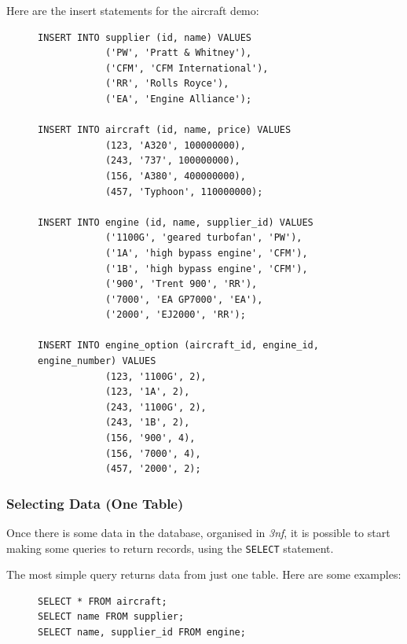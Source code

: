 \documentclass[10pt]{article}
\begin{document}
Here are the insert statements for the aircraft demo:

\begin{figure}[H]
\begin{verbatim}
INSERT INTO supplier (id, name) VALUES
            ('PW', 'Pratt & Whitney'),
            ('CFM', 'CFM International'),
            ('RR', 'Rolls Royce'),
            ('EA', 'Engine Alliance');

INSERT INTO aircraft (id, name, price) VALUES
            (123, 'A320', 100000000),
            (243, '737', 100000000),
            (156, 'A380', 400000000),
            (457, 'Typhoon', 110000000);

INSERT INTO engine (id, name, supplier_id) VALUES
            ('1100G', 'geared turbofan', 'PW'),
            ('1A', 'high bypass engine', 'CFM'),
            ('1B', 'high bypass engine', 'CFM'),
            ('900', 'Trent 900', 'RR'),
            ('7000', 'EA GP7000', 'EA'),
            ('2000', 'EJ2000', 'RR');

INSERT INTO engine_option (aircraft_id, engine_id, engine_number) VALUES
            (123, '1100G', 2),
            (123, '1A', 2),
            (243, '1100G', 2),
            (243, '1B', 2),
            (156, '900', 4),
            (156, '7000', 4),
            (457, '2000', 2);
\end{verbatim}
\end{figure}

\subsubsection{Selecting Data (One Table)}
\label{sec:org3673686}

Once there is some data in the database, organised in \emph{3nf}, it is possible to start making some queries to return records, using the \texttt{SELECT} statement.

The most simple query returns data from just one table. Here are some examples:

\begin{figure}[H]
\begin{verbatim}
SELECT * FROM aircraft;
SELECT name FROM supplier;
SELECT name, supplier_id FROM engine;
\end{verbatim}
\end{figure}
\end{document}

